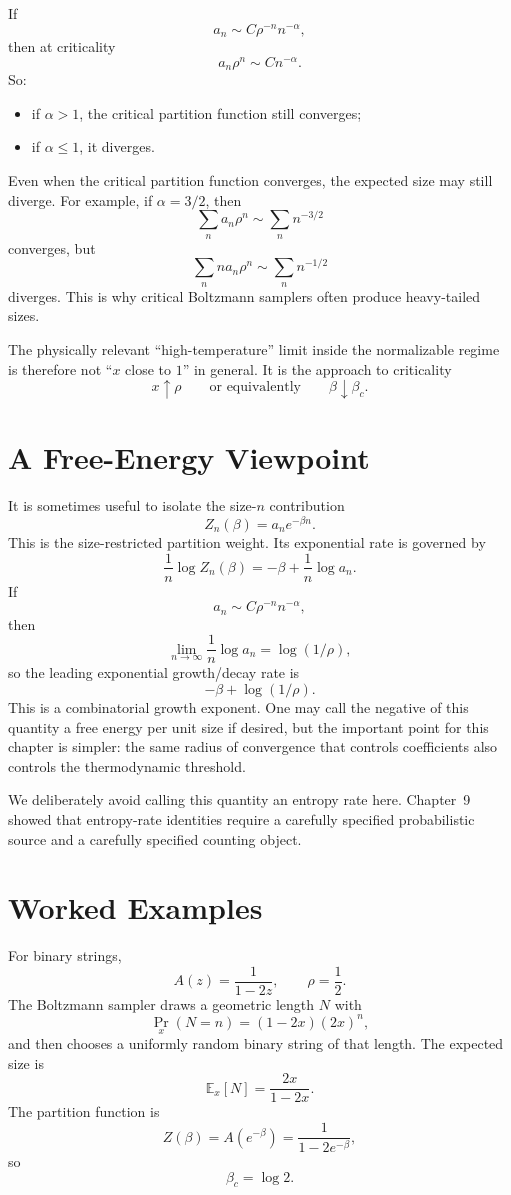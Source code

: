If
\[
  a_n \sim C\rho^{-n} n^{-\alpha},
\]
then at criticality
\[
  a_n \rho^n \sim C n^{-\alpha}.
\]
So:
\begin{itemize}
  \item if $\alpha>1$, the critical partition function still converges;
  \item if $\alpha \le 1$, it diverges.
\end{itemize}

Even when the critical partition function converges, the expected size may still diverge. For example, if $\alpha=3/2$, then
\[
  \sum_n a_n \rho^n \sim \sum_n n^{-3/2}
\]
converges, but
\[
  \sum_n n a_n \rho^n \sim \sum_n n^{-1/2}
\]
diverges. This is why critical Boltzmann samplers often produce heavy-tailed sizes.

The physically relevant ``high-temperature'' limit inside the normalizable regime is therefore not ``$x$ close to $1$'' in general. It is the approach to criticality
\[
  x \uparrow \rho
  \qquad\text{or equivalently}\qquad
  \beta \downarrow \beta_c.
\]

\section{A Free-Energy Viewpoint}

It is sometimes useful to isolate the size-$n$ contribution
\[
  Z_n(\beta) = a_n e^{-\beta n}.
\]
This is the size-restricted partition weight. Its exponential rate is governed by
\[
  \frac{1}{n}\log Z_n(\beta) = -\beta + \frac{1}{n}\log a_n.
\]
If
\[
  a_n \sim C\rho^{-n}n^{-\alpha},
\]
then
\[
  \lim_{n\to\infty} \frac{1}{n}\log a_n = \log(1/\rho),
\]
so the leading exponential growth/decay rate is
\[
  -\beta + \log(1/\rho).
\]
This is a combinatorial growth exponent. One may call the negative of this quantity a free energy per unit size if desired, but the important point for this chapter is simpler: the same radius of convergence that controls coefficients also controls the thermodynamic threshold.

We deliberately avoid calling this quantity an entropy rate here. Chapter~9 showed that entropy-rate identities require a carefully specified probabilistic source and a carefully specified counting object.

\section{Worked Examples}

\begin{example}
For binary strings,
\[
  A(z)=\frac{1}{1-2z},
  \qquad \rho=\frac{1}{2}.
\]
The Boltzmann sampler draws a geometric length $N$ with
\[
  \Pr_x(N=n) = (1-2x)(2x)^n,
\]
and then chooses a uniformly random binary string of that length. The expected size is
\[
  \mathbb E_x[N] = \frac{2x}{1-2x}.
\]
The partition function is
\[
  Z(\beta)=A(e^{-\beta})=\frac{1}{1-2e^{-\beta}},
\]
so
\[
  \beta_c = \log 2.
\]
\end{example}

